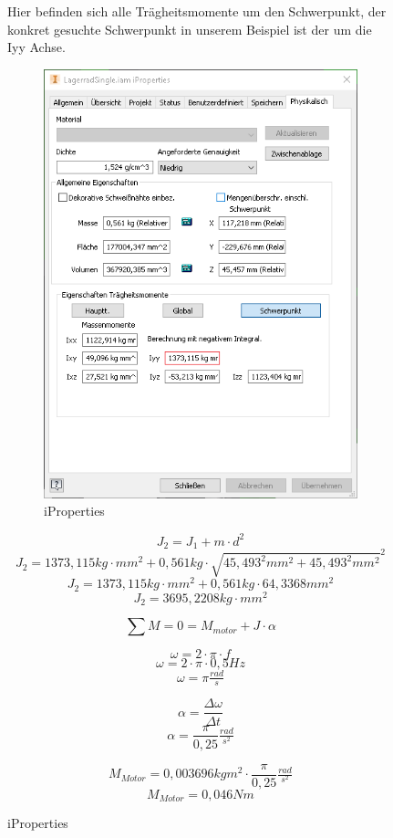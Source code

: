 \begin{figure}
Hier befinden sich alle Trägheitsmomente um den Schwerpunkt, der konkret gesuchte Schwerpunkt in unserem Beispiel ist
der um die Iyy Achse.

\begin{figure}[H]
    \centering
    \includegraphics[scale=1,page=1]{fig/mech/iProberties.png}
    \caption{iProperties}
\end{figure}
\[J_{2}=J_{1}+m\cdot d^{2}\]
\[J_{2}=1373,115 kg\cdot mm^{2}+0,561kg\cdot \sqrt{45,493^{2}mm^{2}+45,493^{2}mm^{2}}^{2}\]
\[J_{2}=1373,115 kg\cdot mm^{2}+0,561kg\cdot 64,3368mm^{2}\]
\[J_{2}=3695,2208 kg\cdot mm^{2}\]


\[\sum M = 0 = M_{motor}+ J\cdot \alpha\]

\[\omega = 2 \cdot \pi \cdot f\]
\[\omega = 2 \cdot \pi \cdot 0,5 Hz\]
\[\omega = \pi \tfrac{rad}{s}\]

\[\alpha = \frac{\Delta \omega }{\Delta t}\]
\[\alpha = \frac{\pi }{0,25} \tfrac{rad}{s^{2}}\]

\[M_{Motor}=0,003696kgm^{2} \cdot \frac{\pi }{0,25}\tfrac{rad}{s^{2}}\]
\[M_{Motor}=0,046Nm\]



\end{figure}
